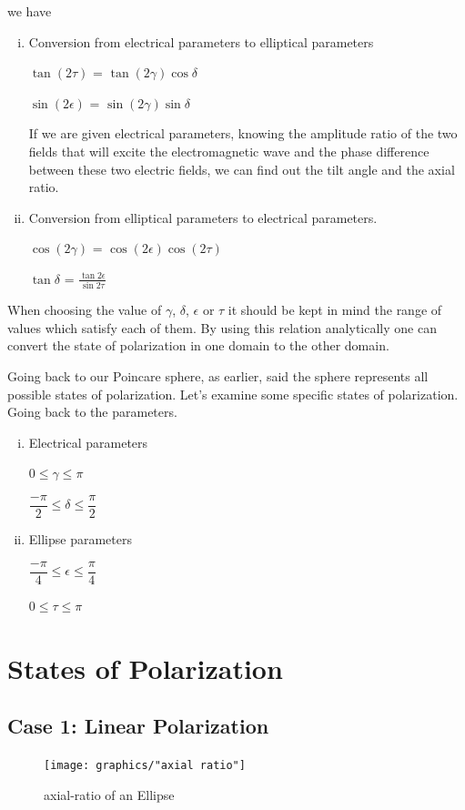 we have 
\begin{enumerate}[(i)]
\item Conversion from electrical parameters to elliptical parameters

$\tan(2\tau)$ = $\tan(2\gamma)$$\cos$$\delta$

$\sin(2\epsilon)$ = $\sin(2\gamma)$$\sin$$\delta$

If we are given electrical parameters, knowing the amplitude ratio of the two fields that will excite the electromagnetic wave and the phase difference between these two electric fields, we can find out the tilt angle and the axial ratio.
\item Conversion from elliptical parameters to electrical parameters.

$\cos(2\gamma)$ = $\cos(2\epsilon)\cos(2\tau)$

$\tan$$\delta$	= $\frac{\tan2\epsilon}{\sin2\tau}$
\end{enumerate}
When choosing the value of $\gamma$, $\delta$, $\epsilon$ or $\tau$ it should be kept in mind the range of values which satisfy each of them. By using this relation analytically one can convert the state of polarization in one domain to the other domain.

Going back to our Poincare sphere, as earlier, said the sphere represents all possible states of polarization. Let's examine some specific states of polarization. Going back to the parameters.
\begin{enumerate}[(i)]
\item Electrical parameters 

0$\leq$$\gamma$$\leq$$\pi$

$\dfrac{-\pi}{2}$$\leq$$\delta$$\leq$$\dfrac{\pi}{2}$
\item Ellipse parameters

$\dfrac{-\pi}{4}$$\leq$$\epsilon$$\leq$$\dfrac{\pi}{4}$

0$\leq$$\tau$$\leq$$\pi$
\end{enumerate}

\section{States of Polarization}
\subsection{Case 1: Linear Polarization}

\begin{figure}[h]
\centering
\texttt{[image: graphics/"axial ratio"]}
\caption{axial-ratio of an Ellipse}
\label{fig:axial-ratio}
\end{figure}

